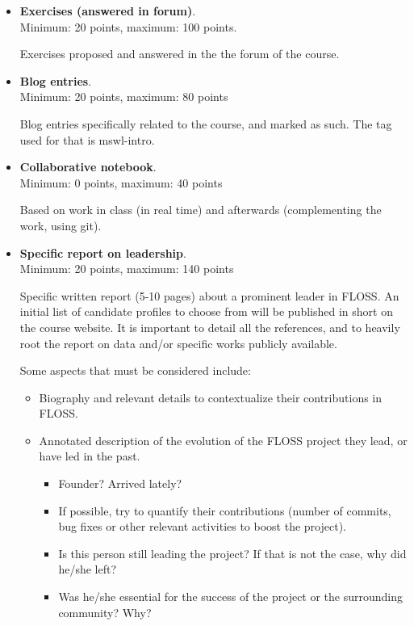 \documentclass[a4paper]{article}
\begin{document}
\begin{itemize}
\item \textbf{Exercises (answered in forum)}. \\
  Minimum: 20 points, maximum: 100 points.

  Exercises proposed and answered in the the forum of the course.

\item \textbf{Blog entries}. \\
  Minimum: 20 points, maximum: 80 points

  Blog entries specifically related to the course, and marked as such. The tag used for that is mswl-intro.

\item \textbf{Collaborative notebook}. \\
  Minimum: 0 points, maximum: 40 points

  Based on work in class (in real time) and afterwards (complementing the work, using git).

\item \textbf{Specific report on leadership}. \\
  Minimum: 20 points, maximum: 140 points

  Specific written report (5-10 pages) about a prominent leader in FLOSS. An initial list of candidate profiles to choose
from will be published in short on the course website. It is important to detail all the references, and to 
heavily root the report on data and/or specific works publicly available.

  Some aspects that must be considered include:
  \begin{itemize}
   \item Biography and relevant details to contextualize their contributions in FLOSS.
   \item Annotated description of the evolution of the FLOSS project they lead, or have led in the past.
   \begin{itemize}
    \item Founder? Arrived lately?
    \item If possible, try to quantify their contributions (number of commits, bug fixes or other relevant 
    activities to boost the project).
    \item Is this person still leading the project? If that is not the case, why did he/she left?
    \item Was he/she essential for the success of the project or the surrounding community? Why?
   \end{itemize}


\end{itemize}
\end{itemize}
\end{document}
